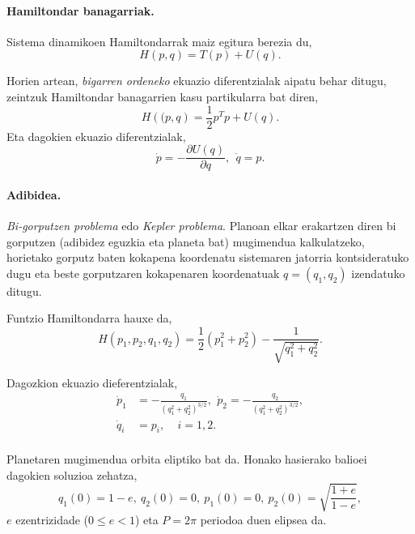 \paragraph*{Hamiltondar banagarriak.} Sistema dinamikoen Hamiltondarrak maiz egitura berezia du,
\begin{equation*}
H({p},{q})=T(p)+U({q}).
\end{equation*} 

Horien artean, \emph{bigarren ordeneko} ekuazio diferentzialak aipatu behar ditugu, zeintzuk Hamiltondar banagarrien kasu partikularra bat diren,  
\begin{equation*}
H(\mathbf(p,q)=\frac{1}{2}p^Tp +U(q).
\end{equation*}
Eta dagokien ekuazio diferentzialak,
\begin{equation}
\label{eq:biorden}
\dot{p}=-\frac{\partial U(q)}{\partial q}, \ \ \dot{q}=p. 
\end{equation}

\paragraph*{Adibidea.}
\emph{Bi-gorputzen problema} edo \emph{Kepler problema}. Planoan elkar erakartzen diren bi gorputzen (adibidez eguzkia eta planeta bat) mugimendua kalkulatzeko, horietako gorputz baten kokapena koordenatu sistemaren jatorria kontsideratuko dugu eta beste gorputzaren kokapenaren koordenatuak $q=(q_1,q_2)$ izendatuko ditugu. 

Funtzio Hamiltondarra hauxe da,
\begin{equation*}
H(p_1,p_2,q_1,q_2)=\frac{1}{2}(p_1^2+p_2^2)-\frac{1}{\sqrt{q_1^2+q_2^2}}.
\end{equation*}

Dagozkion ekuazio dieferentzialak,
\begin{align*}
\dot{p}_1 &= -\frac{q_1}{(q_1^2+q_2^2)^{3/2}}, \ \, \dot{p}_2= -\frac{q_2}{(q_1^2+q_2^2)^{3/2}}, \\
\dot{q}_i &=p_i, \ \ \ \ \ i=1,2.
\end{align*}

\paragraph*{} Planetaren mugimendua orbita eliptiko bat da. Honako hasierako balioei dagokien soluzioa zehatza,
\begin{equation*}
q_1(0)=1-e, \ q_2(0)=0, \ p_1(0)=0, \ p_2(0)=\sqrt{ \frac{1+e}{1-e}}, 
\end{equation*}
$e$ ezentrizidade ($0\le e < 1$)  eta $P=2\pi$ periodoa duen elipsea da. 

